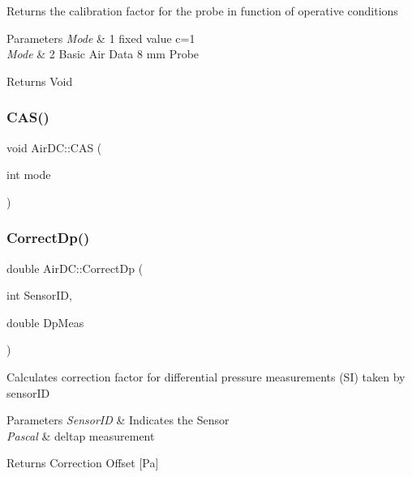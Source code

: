 Returns the calibration factor for the probe in function of operative conditions 
\begin{DoxyParams}{Parameters}
{\em Mode} & 1 fixed value c=1 \\
\hline
{\em Mode} & 2 Basic Air Data 8 mm Probe \\
\hline
\end{DoxyParams}
\begin{DoxyReturn}{Returns}
Void 
\end{DoxyReturn}
\mbox{\label{class_air_d_c_a7ff5cc226ca2b14d7c03fafef41e6a84}} 
\subsubsection{\texorpdfstring{C\+A\+S()}{CAS()}}
{\footnotesize\ttfamily void Air\+D\+C\+::\+C\+AS (\begin{DoxyParamCaption}\item[{int}]{mode }\end{DoxyParamCaption})}

\mbox{\label{class_air_d_c_af4044df1cd0d9b477f19b37f3cdc8836}} 
\subsubsection{\texorpdfstring{Correct\+Dp()}{CorrectDp()}}
{\footnotesize\ttfamily double Air\+D\+C\+::\+Correct\+Dp (\begin{DoxyParamCaption}\item[{int}]{Sensor\+ID,  }\item[{double}]{Dp\+Meas }\end{DoxyParamCaption})}

Calculates correction factor for differential pressure measurements (SI) taken by sensor\+ID 
\begin{DoxyParams}{Parameters}
{\em Sensor\+ID} & Indicates the Sensor \\
\hline
{\em Pascal} & deltap measurement \\
\hline
\end{DoxyParams}
\begin{DoxyReturn}{Returns}
Correction Offset \mbox{[}Pa\mbox{]} 
\end{DoxyReturn}
\mbox{\label{class_air_d_c_af26c8e8ef7fa070a72f0a5777cf91ec0}} 
